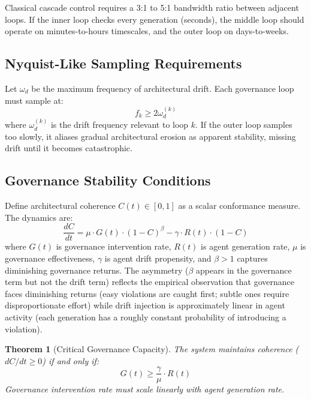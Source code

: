 \documentclass[11pt, a4paper, logo, copyright]{googledeepmind}
\newtheorem{theorem}{Theorem}[section]
\begin{document}
Classical cascade control requires a 3:1 to 5:1 bandwidth ratio between adjacent loops. If the inner loop checks every generation (seconds), the middle loop should operate on minutes-to-hours timescales, and the outer loop on days-to-weeks.

\subsection{Nyquist-Like Sampling Requirements}

Let $\omega_d$ be the maximum frequency of architectural drift. Each governance loop must sample at:
\begin{equation}
    f_k \geq 2\omega_d^{(k)}
\end{equation}
where $\omega_d^{(k)}$ is the drift frequency relevant to loop $k$. If the outer loop samples too slowly, it aliases gradual architectural erosion as apparent stability, missing drift until it becomes catastrophic.

\subsection{Governance Stability Conditions}

Define architectural coherence $C(t) \in [0,1]$ as a scalar conformance measure. The dynamics are:
\begin{equation}
    \frac{dC}{dt} = \mu \cdot G(t) \cdot (1 - C)^\beta - \gamma \cdot R(t) \cdot (1 - C)
\end{equation}
where $G(t)$ is governance intervention rate, $R(t)$ is agent generation rate, $\mu$ is governance effectiveness, $\gamma$ is agent drift propensity, and $\beta > 1$ captures diminishing governance returns. The asymmetry ($\beta$ appears in the governance term but not the drift term) reflects the empirical observation that governance faces diminishing returns (easy violations are caught first; subtle ones require disproportionate effort) while drift injection is approximately linear in agent activity (each generation has a roughly constant probability of introducing a violation).

\begin{theorem}[Critical Governance Capacity]
\label{thm:critical}
The system maintains coherence ($dC/dt \geq 0$) if and only if:
\begin{equation}
    G(t) \geq \frac{\gamma}{\mu} \cdot R(t)
\end{equation}
Governance intervention rate must scale linearly with agent generation rate.
\end{theorem}
\end{document}

